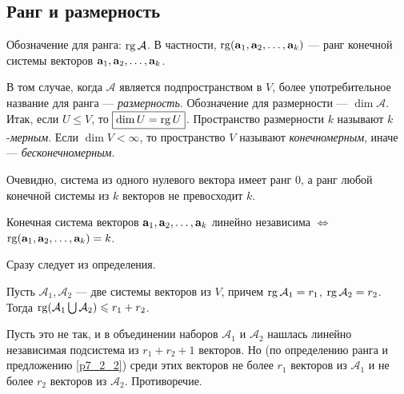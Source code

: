 \subsection{Ранг и размерность}


Обозначение для ранга: $\mathop{\rm rg}\nolimits \mathcal{A}$. 
 В частности,
 $\mathop{\rm rg}\nolimits(\mathbf{a}_1, \mathbf{a}_2, \ldots, \mathbf{a}_k)$ --- ранг конечной системы
векторов $\mathbf{a}_1, \mathbf{a}_2, \ldots, \mathbf{a}_k$.

В том случае, когда $\mathcal{A}$ является подпространством в $V$, более употребительное
название для ранга ---
{\it размерность}. Обозначение для размерности --- $\dim \mathcal{A}$.
Итак, если $U\leq V$, то $\boxed{\mathop{\rm dim}\nolimits U = \mathop{\rm rg}\nolimits U}$.
Пространство размерности $k$ называют $k$-{\it мерным}.
Если $\dim V < \infty$, то пространство $V$ называют {\it конечномерным}, иначе --- {\it бесконечномерным}.

Очевидно, система из одного нулевого вектора имеет ранг 0,
а ранг любой конечной системы из $k$ векторов не превосходит $k$.

\begin{predl}\label{p7_2_4}
Конечная система векторов $\mathbf{a}_1, \mathbf{a}_2, \ldots, \mathbf{a}_k $ линейно независима $\Leftrightarrow$
$\mathop{\rm rg}\nolimits (\mathbf{a}_1, \mathbf{a}_2, \ldots, \mathbf{a}_k) = k$.
\end{predl}
\dok Сразу следует из определения.
\edok

\otstup

\begin{predl}\label{p7_2_5} Пусть $\mathcal{A}_1, \mathcal{A}_2$ --- две системы векторов из
$V$, причем
$\mathop{\rm rg}\nolimits \mathcal{A}_1 = r_1$, $\mathop{\rm rg}\nolimits \mathcal{A}_2 = r_2$. Тогда
$\mathop{\rm rg}\nolimits(\mathcal{A}_1 \bigcup \mathcal{A}_2) \leqslant r_1+r_2$.
\end{predl}
\dok 
Пусть это не так, и в объединении наборов
$\mathcal{A}_1$ и $\mathcal{A}_2$ нашлась
линейно независимая подсистема из $r_1+r_2+1$ векторов.
Но (по определению ранга и предложению \ref{p7_2_2})
среди этих векторов не более $r_1$ векторов из $\mathcal{A}_1$
и не более $r_2$ векторов из $\mathcal{A}_2$. Противоречие.
\edok


